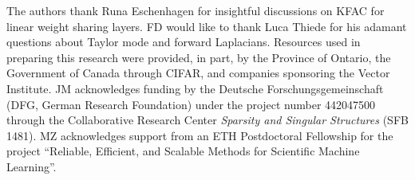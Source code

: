 \begin{ack} %
  The authors thank Runa Eschenhagen for insightful discussions on KFAC for linear weight sharing layers.
  FD would like to thank Luca Thiede for his adamant questions about Taylor mode and forward Laplacians.
  Resources used in preparing this research were provided, in part, by the Province of Ontario, the Government of Canada through CIFAR, and companies sponsoring the Vector Institute.
  JM acknowledges funding by the Deutsche Forschungsgemeinschaft (DFG, German Research Foundation) under the project number 442047500 through the Collaborative Research Center \emph{Sparsity and Singular Structures} (SFB 1481).
  MZ acknowledges support from an ETH Postdoctoral Fellowship for the project ``Reliable, Efficient, and Scalable Methods for Scientific Machine Learning''.
\end{ack}
